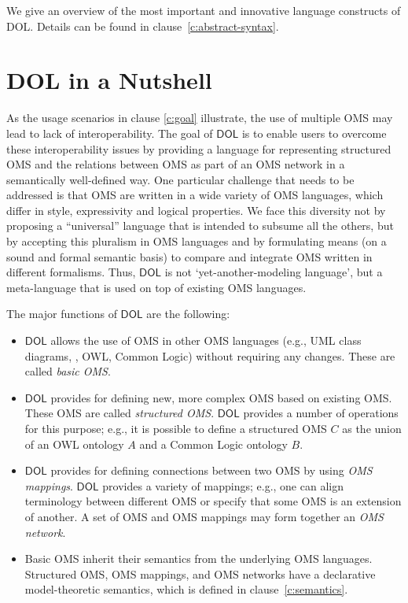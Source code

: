 \documentclass[10pt,fleqn,%
\ifpretendfinal
final%
\else
draft%
\fi,
]{scrreprt}
\makeatletter
\newcommand*\CommentAuthor{}
\renewcommand*\CommentAuthor{#1}}
\newcommand*\CommentDate{}
\renewcommand*\CommentDate{#1}}
\newcommand*\CommentId{}
\renewcommand*\CommentId{#1}}
\newcommand*\CommentType{}
\renewcommand*\CommentType{#1}}
\newcommand*{\SetCommentColorByType}[1]{%
\edef\localType{{#1}}%
\expandafter\ifstrequal\localType{q-aut}{\colorlet{CommentColor}{red}}{%
\expandafter\ifstrequal\localType{q-all}{\colorlet{CommentColor}{orange}}{%
\expandafter\ifstrequal\localType{todo}{\colorlet{CommentColor}{orange}}{%
\expandafter\ifstrequal\localType{fyi}{\colorlet{CommentColor}{lightgray}}{%
\colorlet{CommentColor}{yellow}}}}}}
\newcommand*{\SetCommentPrefixByType}[1]{%
\edef\localType{{#1}}%
\expandafter\@ifmtarg\localType{%
\edef\CommentPrefix{}%
}{%
\caseupper[q]{#1}%
\edef\CommentPrefix{\thestring: }%
}}
\newcommand*{\initComment}[1]{%
\setkeys{Comment}{#1}%
\SetCommentColorByType{\CommentType}%
\relax%
\SetCommentPrefixByType{\CommentType}%
\relax%
}
\newcommand*{\todonote}[2][]{%
\initComment{#1}%
\pdfcomment[author=\CommentAuthor,color=CommentColor,date=\CommentDate,id=\CommentId]{%
\CommentPrefix
#2}}
\renewcommand*{\todonote}[2][]{%
\initComment{#1}%
\ednote{\CommentPrefix #2}}
\newcommand*{\DOL}{\ensuremath{\mathsf{DOL}}\xspace}
\newcommand{\clauserefname}{clause}
\newcommand{\cref}[1]{\clauserefname~\ref{#1}}
\makeatother
\begin{document}
%
%
\label{c:design:overview}
%

We give an overview of the most important and innovative language
constructs of DOL. Details can be found in clause~\ref{c:abstract-syntax}.

\section{DOL in a Nutshell}

As the usage scenarios in clause \ref{c:goal} illustrate, the use of multiple OMS may lead to lack 
 of interoperability. The goal of \DOL is to enable users to overcome these interoperability issues by providing a language for representing 
structured OMS and the relations between OMS as part of an OMS network in a semantically well-defined way. One particular challenge that needs to be
addressed is that OMS are written in a wide variety of OMS languages, which differ in style, 
expressivity and logical properties. 
We face this diversity not by proposing a
``universal'' language that is intended to subsume all the others, but by accepting
this pluralism in OMS languages and by formulating means (on a sound and formal semantic basis) to
 compare and integrate OMS written in different formalisms. Thus, \DOL is not `yet-another-modeling
language', but a meta-language that is used on top of existing OMS languages. 

The major functions of \DOL are the following: 
\begin{itemize}
		\item \DOL allows the use of OMS in other OMS languages (e.g., UML class diagrams, \CASL, 
		OWL, Common Logic) without requiring any changes. These are called \emph{basic OMS}.  
		\item \DOL provides for defining new, more complex  OMS based on existing OMS. These OMS are
		called \emph{structured OMS}. \DOL provides a number of operations for this purpose; e.g.,
		it is possible to define a structured OMS $C$ as the union of an OWL
		ontology $A$ and a Common Logic ontology $B$.
		\item \DOL provides for defining connections between two OMS by using 
		\emph{OMS mappings}. \DOL provides a variety of mappings; e.g.,  one can align terminology 
		between different OMS or specify that some OMS is an extension of another. A set of OMS
		and OMS mappings may form together an \emph{OMS network}.
		\item Basic OMS inherit their semantics from the underlying OMS languages. Structured OMS, 
		OMS mappings, and OMS networks have a declarative model-theoretic semantics, which is 
		 defined in \cref{c:semantics}.  
\end{itemize}
 
\end{document}
